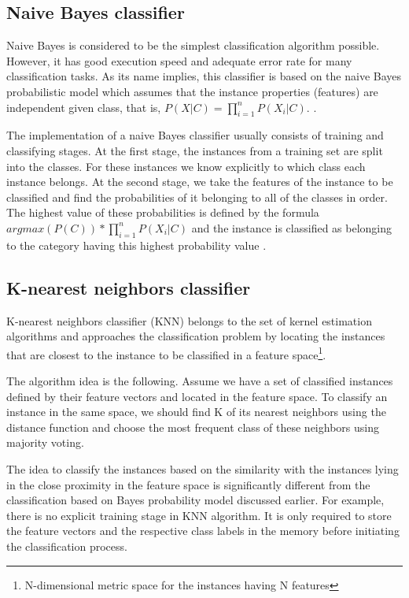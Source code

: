 \documentclass{llncs}
\begin{document}
\subsection{Naive Bayes classifier}

Naive Bayes is considered to be the simplest classification algorithm possible. However, it has good execution speed and adequate error rate for many classification tasks. As its name implies, this classifier is based on the naive Bayes probabilistic model which assumes that the instance properties (features) are independent given class, that is, \(P(X|C) = \prod_{i=1}^nP(X_i|C)\). \cite{Rish}.

The implementation of a naive Bayes classifier usually consists of training and classifying stages. At the first stage, the instances from a training set are split into the classes. For these instances we know explicitly to which class each instance belongs. At the second stage, we take the features of the instance to be classified and find the probabilities of it belonging to all of the classes in order. The highest value of these probabilities is defined by the formula \(argmax(P(C)) * \prod_{i=1}^nP(X_i|C)\) and the instance is classified as belonging to the category having this highest probability value \cite{Manning}\cite{Rish}.

\subsection{K-nearest neighbors classifier}

K-nearest neighbors classifier (KNN) belongs to the set of kernel estimation algorithms and approaches the classification problem by locating the instances that are closest to the instance to be classified in a feature space\footnote{N-dimensional metric space for the instances having N features}\cite{WikiKNN}.

The algorithm idea is the following. Assume we have a set of classified instances defined by their feature vectors and located in the feature space. To classify an instance in the same space, we should find K of its nearest neighbors using the distance function and choose the most frequent class of these neighbors using majority voting.

The idea to classify the instances based on the similarity with the instances lying in the close proximity in the feature space is significantly different from the classification based on Bayes probability model discussed earlier. For example, there is no explicit training stage in KNN algorithm. It is only required to store the feature vectors and the respective class labels in the memory before initiating the classification process.
\end{document}
